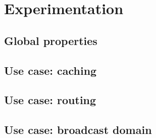 
\section{Experimentation}
\label{sec:experimentation}

\subsection{Global properties}

\subsection{Use case: caching}

\subsection{Use case: routing}

\subsection{Use case: broadcast domain}

